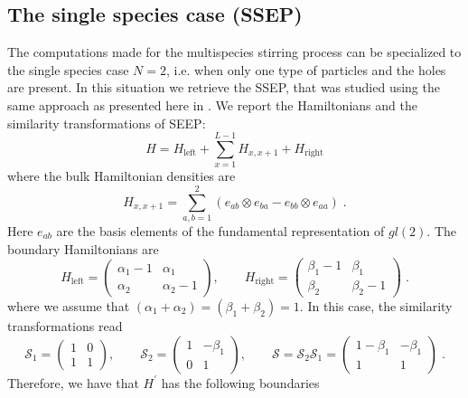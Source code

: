 \documentclass[10pt]{article}
\numberwithin{equation}{section}
\numberwithin{equation}{subsection}
\newcommand{\dt}{\;.}
\begin{document}
{\subsection{The single species case (SSEP)}
The computations made for the multispecies stirring process can be specialized to the single species case $N=2$, {i.e. when only one type of particles and the holes are present.} In this situation we retrieve the SSEP, that was studied using the same approach as presented here in \cite{frassek2020eigenstates}. We report the Hamiltonians and the similarity transformations of SEEP: 
\begin{equation}
	H=H_{\text{left}}+\sum_{x=1}^{L-1}H_{x,x+1}+H_{\text{right}}
\end{equation}
where the bulk Hamiltonian densities are 
\begin{equation}
	H_{x,x+1}=\sum_{a,b=1}^{2}\left(e_{ab}\otimes e_{ba}-e_{bb}\otimes e_{aa}\right)\dt
\end{equation}
Here $e_{ab}$ are the basis elements of the fundamental representation of $gl(2)$. The boundary Hamiltonians are
\begin{equation}
	H_{\text{left}}=\begin{pmatrix}
		\alpha_{1}-1&\alpha_{1}\\
		\alpha_{2}&\alpha_{2}-1
	\end{pmatrix},\qquad H_{\text{right}}=\begin{pmatrix}
	\beta_{1}-1&\beta_{1}\\
	\beta_{2}&\beta_{2}-1
\end{pmatrix}\dt
\end{equation} 
where we assume that $(\alpha_{1}+\alpha_{2})=(\beta_{1}+\beta_{2})=1$. In this case, the similarity transformations read
\begin{equation}
	\mathcal{S}_{1}=\begin{pmatrix}
		1&0\\
		1&1
	\end{pmatrix},\qquad \mathcal{S}_{2}=\begin{pmatrix}
	1&-\beta_{1}\\
	0&1
\end{pmatrix},\qquad \mathcal{S}=\mathcal{S}_{2}\mathcal{S}_{1}=\begin{pmatrix}
1-\beta_{1}&-\beta_{1}\\
1&1
\end{pmatrix}\dt
\end{equation}
Therefore, we have that $H^{'}$ has the following boundaries
\begin{equation}

\end{equation}}
\end{document}
